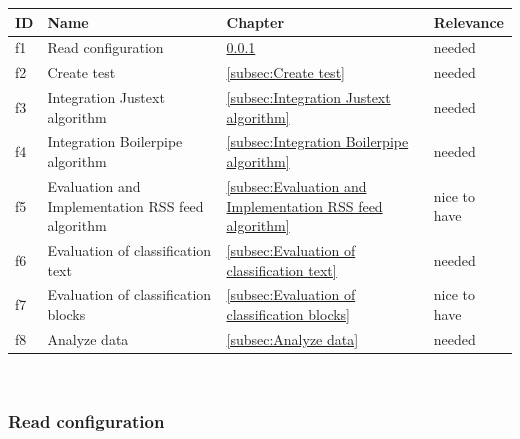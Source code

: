 	\begin{tabular}{ | p{0.5cm} | p{9cm} |p{2cm} |p{2.5cm} |}
	\hline
	\textbf{ID}	& \textbf{Name} 									& \textbf{Chapter}    											& \textbf{Relevance}	\\ \hline
	f1  		& Read configuration 								& \ref{subsec:Read configuration}  								& needed 				\\ \hline
	f2  		& Create test 										& \ref{subsec:Create test}										& needed 				\\ \hline
	f3  		& Integration Justext algorithm 					& \ref{subsec:Integration Justext algorithm} 					& needed 				\\ \hline
	f4  		& Integration Boilerpipe algorithm 					& \ref{subsec:Integration Boilerpipe algorithm}  				& needed 				\\ \hline
	f5  		& Evaluation and Implementation RSS feed algorithm 	& \ref{subsec:Evaluation and Implementation RSS feed algorithm} & nice to have			\\ \hline
	f6  		& Evaluation of classification text 				& \ref{subsec:Evaluation of classification text}				& needed 				\\ \hline
	f7  		& Evaluation of classification blocks 				& \ref{subsec:Evaluation of classification blocks}	  			& nice to have			\\ \hline
	f8  		& Analyze data 										& \ref{subsec:Analyze data}										& needed 				\\ \hline
	\end{tabular} \\



\subsubsection{Read configuration}
\label{subsec:Read configuration}

